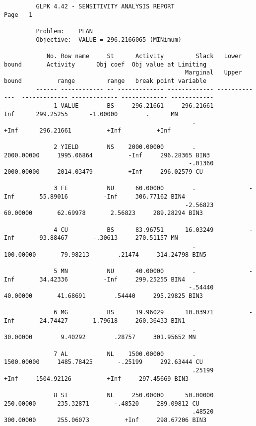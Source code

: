 \newpage

\begin{landscape}
\begin{footnotesize}
\begin{verbatim}
         GLPK 4.42 - SENSITIVITY ANALYSIS REPORT                                                                         Page   1

         Problem:    PLAN
         Objective:  VALUE = 296.2166065 (MINimum)

            No. Row name     St      Activity         Slack   Lower bound       Activity      Obj coef  Obj value at Limiting
                                                   Marginal   Upper bound          range         range   break point variable
         ------ ------------ -- ------------- ------------- -------------  ------------- ------------- ------------- ------------
              1 VALUE        BS     296.21661    -296.21661          -Inf      299.25255      -1.00000        .      MN
                                                     .               +Inf      296.21661          +Inf          +Inf

              2 YIELD        NS    2000.00000        .         2000.00000     1995.06864          -Inf     296.28365 BIN3
                                                    -.01360    2000.00000     2014.03479          +Inf     296.02579 CU

              3 FE           NU      60.00000        .               -Inf       55.89016          -Inf     306.77162 BIN4
                                                   -2.56823      60.00000       62.69978       2.56823     289.28294 BIN3

              4 CU           BS      83.96751      16.03249          -Inf       93.88467       -.30613     270.51157 MN
                                                     .          100.00000       79.98213        .21474     314.24798 BIN5

              5 MN           NU      40.00000        .               -Inf       34.42336          -Inf     299.25255 BIN4
                                                    -.54440      40.00000       41.68691        .54440     295.29825 BIN3

              6 MG           BS      19.96029      10.03971          -Inf       24.74427      -1.79618     260.36433 BIN1
                                                     .           30.00000        9.40292        .28757     301.95652 MN

              7 AL           NL    1500.00000        .         1500.00000     1485.78425       -.25199     292.63444 CU
                                                     .25199          +Inf     1504.92126          +Inf     297.45669 BIN3

              8 SI           NL     250.00000      50.00000     250.00000      235.32871       -.48520     289.09812 CU
                                                     .48520     300.00000      255.06073          +Inf     298.67206 BIN3
\end{verbatim}
\end{footnotesize}
\end{landscape}

